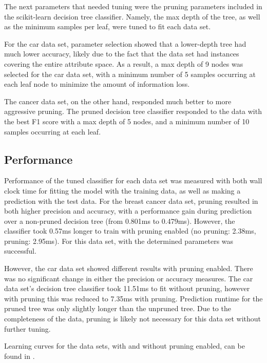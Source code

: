 \documentclass{article}
\begin{document}
    The next parameters that needed tuning were the pruning parameters included in the scikit-learn decision tree classifier. Namely, the max depth of the tree, as well as the minimum samples per leaf, were tuned to fit each data set.

    For the car data set, parameter selection showed that a lower-depth tree had much lower accuracy, likely due to the fact that the data set had instances covering the entire attribute space. As a result, a max depth of 9 nodes was selected for the car data set, with a minimum number of 5 samples occurring at each leaf node to minimize the amount of information loss.

    The cancer data set, on the other hand, responded much better to more aggressive pruning. The pruned decision tree classifier responded to the data with the best F1 score with a max depth of 5 nodes, and a minimum number of 10 samples occurring at each leaf.

    \subsection{Performance}
    Performance of the tuned classifier for each data set was measured with both wall clock time for fitting the model with the training data, as well as making a prediction with the test data. For the breast cancer data set, pruning resulted in both higher precision and accuracy, with a performance gain during prediction over a non-pruned decision tree (from 0.801ms to 0.479ms). However, the classifier took 0.57ms longer to train with pruning enabled (no pruning: 2.38ms, pruning: 2.95ms). For this data set, with the determined parameters was successful.

    However, the car data set showed different results with pruning enabled. There was no significant change in either the precision or accuracy measures. The car data set's decision tree classifier took 11.51ms to fit without pruning, however with pruning this was reduced to 7.35ms with pruning. Prediction runtime for the pruned tree was only slightly longer than the unpruned tree. Due to the completeness of the data, pruning is likely not necessary for this data set without further tuning.

    Learning curves for the data sets, with and without pruning enabled, can be found in .
\end{document}
